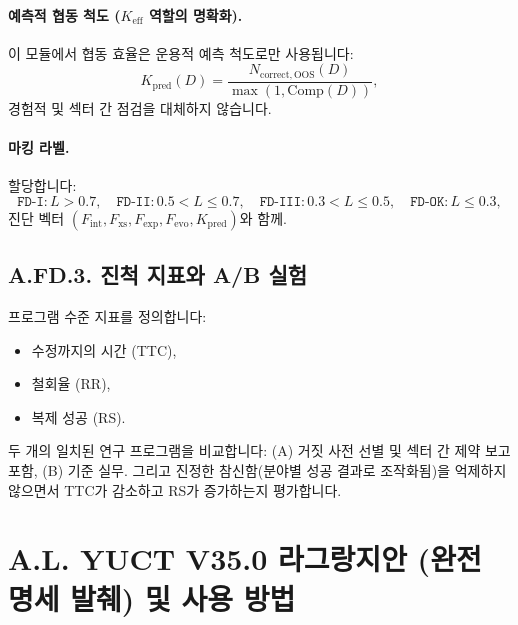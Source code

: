 \documentclass[13pt,a4paper]{article}
\newcommand{\Keff}{K_{\mathrm{eff}}}
\newcommand{\Kpred}{K_{\mathrm{pred}}}
\begin{document}
	\paragraph{예측적 협동 척도 ($\Keff$ 역할의 명확화).}
	이 모듈에서 협동 효율은 운용적 예측 척도로만 사용됩니다:
	\[
	\Kpred(D)=\frac{N_{\mathrm{correct,OOS}}(D)}{\max(1,\mathrm{Comp}(D))},
	\]
	경험적 및 섹터 간 점검을 대체하지 않습니다.
	
	\paragraph{마킹 라벨.}
	할당합니다:
	\[
	\texttt{FD-I}: L>0.7,\quad
	\texttt{FD-II}: 0.5<L\le0.7,\quad
	\texttt{FD-III}: 0.3<L\le0.5,\quad
	\texttt{FD-OK}: L\le0.3,
	\]
	진단 벡터 $(F_{\mathrm{int}},F_{\mathrm{xs}},F_{\mathrm{exp}},F_{\mathrm{evo}},\Kpred)$와 함께.
	
	\subsection*{A.FD.3. 진척 지표와 A/B 실험}
	프로그램 수준 지표를 정의합니다:
	\begin{itemize}[leftmargin=*]
		\item 수정까지의 시간 (TTC),
		\item 철회율 (RR),
		\item 복제 성공 (RS).
	\end{itemize}
	두 개의 일치된 연구 프로그램을 비교합니다: (A) 거짓 사전 선별 및 섹터 간 제약 보고 포함, (B) 기준 실무. 그리고 진정한 참신함(분야별 성공 결과로 조작화됨)을 억제하지 않으면서 TTC가 감소하고 RS가 증가하는지 평가합니다.
	
	\section*{A.L. YUCT V35.0 라그랑지안 (완전 명세 발췌) 및 사용 방법}
	
\end{document}
